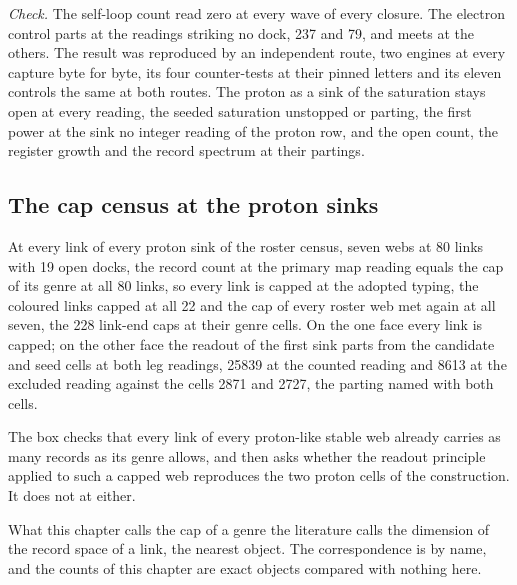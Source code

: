 \begin{chproof}
\emph{Check.} The self-loop count read zero at every wave of every closure. The electron control parts at the readings striking no dock, 237 and 79, and meets at the others. The result was reproduced by an independent route, two engines at every capture byte for byte, its four counter-tests at their pinned letters and its eleven controls the same at both routes.
The proton as a sink of the saturation stays open at every reading, the seeded saturation unstopped or parting, the first power at the sink no integer reading of the proton row, and the open count, the register growth and the record spectrum at their partings.
\end{chproof}
\label{chend:VII-4-proton-as-a-seeded-sink}
\subsection{The cap census at the proton sinks}\label{mod:VII-4-D535254-w-prca}
\begin{chwall}\label{box:VII-4-D535254-w-prca:1}
At every link of every proton sink of the roster census, seven webs at 80 links with 19 open docks, the record count at the primary map reading equals the cap of its genre at all 80 links, so every link is capped at the adopted typing, the coloured links capped at all 22 and the cap of every roster web met again at all seven, the 228 link-end caps at their genre cells. On the one face every link is capped; on the other face the readout of the first sink parts from the candidate and seed cells at both leg readings, 25839 at the counted reading and 8613 at the excluded reading against the cells 2871 and 2727, the parting named with both cells.
\end{chwall}
The box checks that every link of every proton-like stable web already carries as many records as its genre allows, and then asks whether the readout principle applied to such a capped web reproduces the two proton cells of the construction. It does not at either.
\begin{chbridge}
What this chapter calls the cap of a genre the literature calls the dimension of the record space of a link, the nearest object. The correspondence is by name, and the counts of this chapter are exact objects compared with nothing here.
\end{chbridge}
